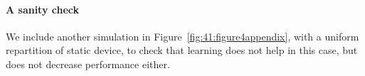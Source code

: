 \paragraph{A sanity check}

We include another simulation in Figure~\ref{fig:41:figure4appendix}, with a uniform repartition of static device, to check that learning does not help in this case, but does not decrease performance either.

\begin{figure}[!t]
    \centering
    \hfill
\end{figure}
